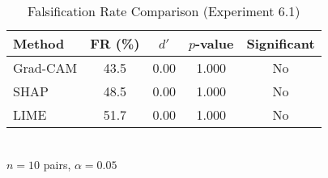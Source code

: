 \begin{table}[htbp]
\centering
\caption{Falsification Rate Comparison (Experiment 6.1)}
\label{tab:exp_6_1_results}
\begin{tabular}{lcccc}
\toprule
Method & FR (\%) & $d'$ & $p$-value & Significant \\ 
\midrule
Grad-CAM & 43.5 & 0.00 & 1.000 & No \\
SHAP & 48.5 & 0.00 & 1.000 & No \\
LIME & 51.7 & 0.00 & 1.000 & No \\
\bottomrule
\end{tabular}
\\[0.5em] {\footnotesize $n=10$ pairs, $\alpha=0.05$}
\end{table}
